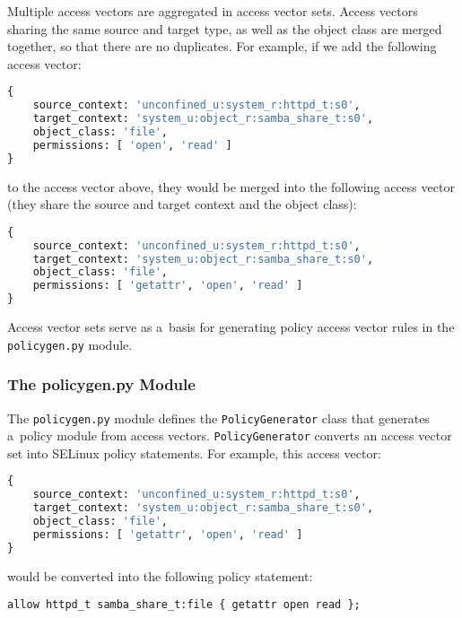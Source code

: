 Multiple access vectors are aggregated in access vector sets. Access vectors
sharing the same source and target type, as well as the object class are merged
together, so that there are no duplicates. For example, if we add the following
access vector:
\begin{lstlisting}[language=Python]
{
    source_context: 'unconfined_u:system_r:httpd_t:s0',
    target_context: 'system_u:object_r:samba_share_t:s0',
    object_class: 'file',
    permissions: [ 'open', 'read' ]
}
\end{lstlisting}
to the access vector above, they would be merged into the following access
vector (they share the source and target context and the object class):
\begin{lstlisting}[language=Python]
{
    source_context: 'unconfined_u:system_r:httpd_t:s0',
    target_context: 'system_u:object_r:samba_share_t:s0',
    object_class: 'file',
    permissions: [ 'getattr', 'open', 'read' ]
}
\end{lstlisting}

Access vector sets serve as a~basis for generating policy access vector rules
in the \texttt{policygen.py} module.

\subsubsection{The policygen.py Module}
The \texttt{policygen.py} module defines the \texttt{PolicyGenerator} class that
generates a~policy module from access vectors. \texttt{PolicyGenerator} converts
an access vector set into SELinux policy statements. For example, this access
vector:
\begin{lstlisting}[language=Python]
{
    source_context: 'unconfined_u:system_r:httpd_t:s0',
    target_context: 'system_u:object_r:samba_share_t:s0',
    object_class: 'file',
    permissions: [ 'getattr', 'open', 'read' ]
}
\end{lstlisting}
would be converted into the following policy statement:
\begin{lstlisting}
allow httpd_t samba_share_t:file { getattr open read };
\end{lstlisting}

